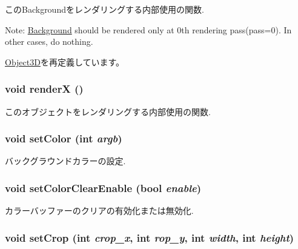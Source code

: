 このBackgroundをレンダリングする内部使用の関数.

Note: \hyperlink{classm3g_1_1Background}{Background} should be rendered only at 0th rendering pass(pass=0). In other cases, do nothing. 

\hyperlink{classm3g_1_1Object3D_8babc8a79b78615da51161e94029eea9}{Object3D}を再定義しています。\hypertarget{classm3g_1_1Background_443a7a301f77f625335ecc06d13bad06}{
\subsubsection[{renderX}]{\setlength{\rightskip}{0pt plus 5cm}void renderX ()}}
\label{classm3g_1_1Background_443a7a301f77f625335ecc06d13bad06}


このオブジェクトをレンダリングする内部使用の関数. \hypertarget{classm3g_1_1Background_38439e862c59a31b90e57c18669061ae}{
\subsubsection[{setColor}]{\setlength{\rightskip}{0pt plus 5cm}void setColor (int {\em argb})}}
\label{classm3g_1_1Background_38439e862c59a31b90e57c18669061ae}


バックグラウンドカラーの設定. \hypertarget{classm3g_1_1Background_68e4fe4cf32fe60f166056115081aa65}{
\subsubsection[{setColorClearEnable}]{\setlength{\rightskip}{0pt plus 5cm}void setColorClearEnable (bool {\em enable})}}
\label{classm3g_1_1Background_68e4fe4cf32fe60f166056115081aa65}


カラーバッファーのクリアの有効化または無効化. \hypertarget{classm3g_1_1Background_e543ac6196bbe65a7af8e6b8686441a7}{
\subsubsection[{setCrop}]{\setlength{\rightskip}{0pt plus 5cm}void setCrop (int {\em crop\_\-x}, \/  int {\em rop\_\-y}, \/  int {\em width}, \/  int {\em height})}}
\label{classm3g_1_1Background_e543ac6196bbe65a7af8e6b8686441a7}


